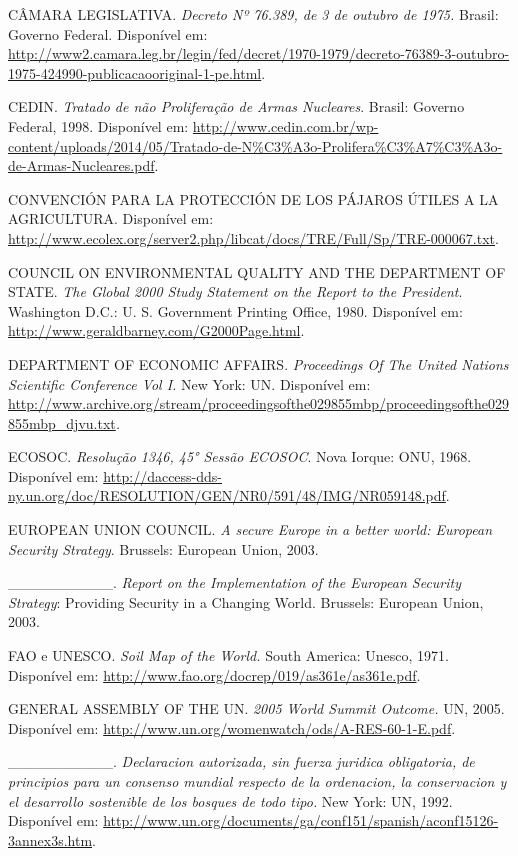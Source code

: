 CÂMARA LEGISLATIVA. \emph{Decreto Nº 76.389, de 3 de outubro de 1975.}
Brasil: Governo Federal. Disponível em:
\url{http://www2.camara.leg.br/legin/fed/decret/1970-1979/decreto-76389-3-outubro-1975-424990-publicacaooriginal-1-pe.html}.

CEDIN. \emph{Tratado de não Proliferação de Armas Nucleares}. Brasil:
Governo Federal, 1998. Disponível em:
\url{http://www.cedin.com.br/wp-content/uploads/2014/05/Tratado-de-N\%C3\%A3o-Prolifera\%C3\%A7\%C3\%A3o-de-Armas-Nucleares.pdf}.

CONVENCIÓN PARA LA PROTECCIÓN DE LOS PÁJAROS ÚTILES A LA AGRICULTURA.
Disponível em:
\url{http://www.ecolex.org/server2.php/libcat/docs/TRE/Full/Sp/TRE-000067.txt}.

COUNCIL ON ENVIRONMENTAL QUALITY AND THE DEPARTMENT OF STATE. \emph{The
Global 2000 Study Statement on the Report to the President}. Washington
D.C.: U. S. Government Printing Office, 1980. Disponível em:
\href{http://www.geraldbarney.com/G2000Page.html}{{http://www.geraldbarney.com/G2000Page.html}}.

DEPARTMENT OF ECONOMIC AFFAIRS. \emph{Proceedings Of The United Nations
Scientific Conference Vol I.} New York: UN. Disponível em:
\href{http://www.archive.org/stream/proceedingsofthe029855mbp/proceedingsofthe029855mbp_djvu.txt}{{http://www.archive.org/stream/proceedingsofthe029855mbp/proceedingsofthe029855mbp\_djvu.txt}}\emph{.}

ECOSOC. \emph{Resolução 1346, 45° Sessão ECOSOC}. Nova Iorque: ONU,
1968. Disponível em:
\url{http://daccess-dds-ny.un.org/doc/RESOLUTION/GEN/NR0/591/48/IMG/NR059148.pdf}.

EUROPEAN UNION COUNCIL. \emph{A secure Europe in a better world:
European Security Strategy}. Brussels: European Union, 2003.

\_\_\_\_\_\_\_\_\_\_. \emph{Report on the Implementation of the European
Security Strategy}: Providing Security in a Changing World. Brussels:
European Union, 2003.

FAO e UNESCO. \emph{Soil Map of the World.} South America: Unesco, 1971.
Disponível em: \url{http://www.fao.org/docrep/019/as361e/as361e.pdf}.

GENERAL ASSEMBLY OF THE UN. \emph{2005 World Summit Outcome.} UN, 2005.
Disponível em: \url{http://www.un.org/womenwatch/ods/A-RES-60-1-E.pdf}.

\_\_\_\_\_\_\_\_\_\_. \emph{Declaracion autorizada, sin fuerza juridica
obligatoria, de principios para un consenso mundial respecto de la
ordenacion, la conservacion y el desarrollo sostenible de los bosques de
todo tipo.} New York: UN, 1992. Disponível em:
\url{http://www.un.org/documents/ga/conf151/spanish/aconf15126-3annex3s.htm}.

